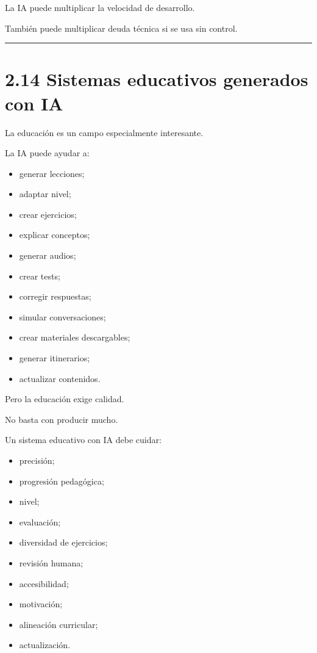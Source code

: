 La IA puede multiplicar la velocidad de desarrollo.

También puede multiplicar deuda técnica si se usa sin control.

\begin{center}\rule{0.5\linewidth}{0.5pt}\end{center}

\section{2.14 Sistemas educativos generados con
IA}\label{sistemas-educativos-generados-con-ia}

La educación es un campo especialmente interesante.

La IA puede ayudar a:

\begin{itemize}
\tightlist
\item
  generar lecciones;
\item
  adaptar nivel;
\item
  crear ejercicios;
\item
  explicar conceptos;
\item
  generar audios;
\item
  crear tests;
\item
  corregir respuestas;
\item
  simular conversaciones;
\item
  crear materiales descargables;
\item
  generar itinerarios;
\item
  actualizar contenidos.
\end{itemize}

Pero la educación exige calidad.

No basta con producir mucho.

Un sistema educativo con IA debe cuidar:

\begin{itemize}
\tightlist
\item
  precisión;
\item
  progresión pedagógica;
\item
  nivel;
\item
  evaluación;
\item
  diversidad de ejercicios;
\item
  revisión humana;
\item
  accesibilidad;
\item
  motivación;
\item
  alineación curricular;
\item
  actualización.
\end{itemize}

